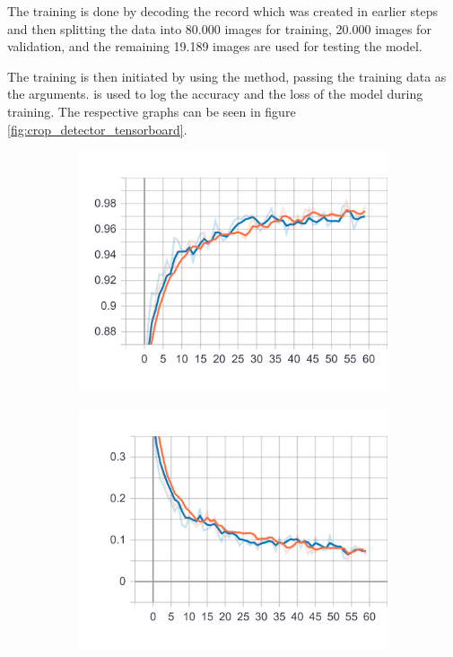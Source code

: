 The training is done by decoding the record which was created in earlier steps and then splitting the data into 80.000 images for training, 20.000 images for validation, and the remaining 19.189 images are used for testing the model.

The training is then initiated by using the  method, passing the training data as the arguments.
is used to log the accuracy and the loss of the model during training.
The respective graphs can be seen in figure \ref{fig:crop_detector_tensorboard}.

\begin{figure}
    \centering
    \begin{subfigure}[b]{0.45\textwidth}
        \includegraphics[width=\textwidth]{images/crop_detector_epoch_acc.png}
    \end{subfigure}
    \begin{subfigure}[b]{0.45\textwidth}
        \includegraphics[width=\textwidth]{images/crop_detector_epoch_loss.png}

\end{subfigure}
\end{figure}
